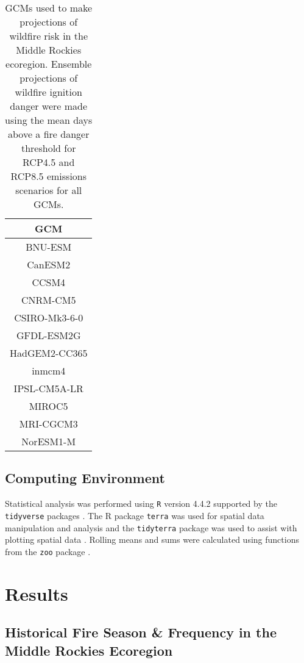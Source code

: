 \documentclass[11pt]{article}
\begin{document}
\begin{table}[h!]
  \centering
  \begin{tabular}{ c }
    \hline
    GCM \\
    \hline
    BNU-ESM \\
    CanESM2 \\
    CCSM4 \\
    CNRM-CM5 \\
    CSIRO-Mk3-6-0 \\
    GFDL-ESM2G \\
    HadGEM2-CC365 \\
    inmcm4 \\
    IPSL-CM5A-LR \\
    MIROC5 \\
    MRI-CGCM3 \\
    NorESM1-M \\
    \hline
  \end{tabular}
  \caption{GCMs used to make projections of wildfire risk in the Middle Rockies ecoregion.  Ensemble projections of wildfire ignition danger were made using the mean days above a fire danger threshold for RCP4.5 and RCP8.5 emissions scenarios for all GCMs.}
  \label{table:gcms}
\end{table}

\subsection{Computing Environment}

Statistical analysis was performed using \texttt{R} version 4.4.2 \citep{rcoreteamLanguageEnvironmentStatistical2024} supported by the \texttt{tidyverse} packages \citep{hernangomezUsingTidyverseTerra2023} .  The R package \texttt{terra} was used for spatial data manipulation and analysis \citep{hijmansTerraSpatialData2024} and the \texttt{tidyterra} package was used to assist with plotting spatial data \citep{hernangomezUsingTidyverseTerra2023}.  Rolling means and sums were calculated using functions from the \texttt{zoo} package \citep{zeileisZooS3Infrastructure2005}.  

\section{Results}

\subsection{Historical Fire Season \& Frequency in the Middle Rockies Ecoregion}
\end{document}
